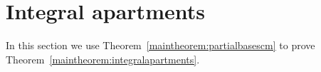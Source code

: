 \documentclass[11 pt]{article}
\theoremstyle{plain}
\theoremstyle{definition}
\numberwithin{equation}{section}
\renewcommand{\O}{\mathcal{O}}
\DeclareMathOperator{\class}{cl}
\DeclareMathOperator{\St}{St}
\newcommand\abs[1]{\left\lvert#1\right\rvert}
\begin{document}
\section{Integral apartments}
\label{section:integralapartments}

In this section we use Theorem~\ref{maintheorem:partialbasescm} to prove Theorem~\ref{maintheorem:integralapartments}.
\end{document}
